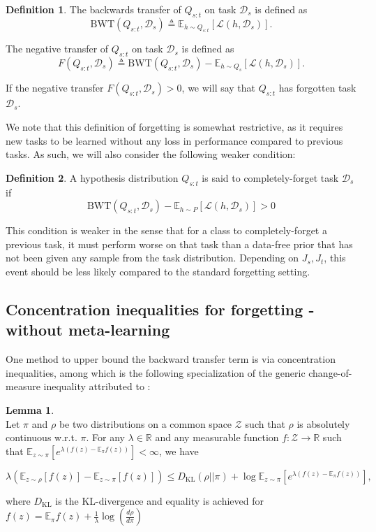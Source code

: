 \documentclass[letterpaper]{article}
\theoremstyle{definition}
\newtheorem{defn}{Definition}[section]
\newtheorem{lemma}{Lemma}[section]
\begin{document}
\begin{defn}
	The backwards transfer of $Q_{s:t}$ on task $\mathcal{D}_s$ is defined as $$\mathrm{BWT}(Q_{s:t}, \mathcal{D}_s) \triangleq \mathbb{E}_{h\sim Q_{s:t}}\left [\mathcal{L}(h, \mathcal{D}_s)\right ].$$
	
	The negative transfer of $Q_{s:t}$ on task $\mathcal{D}_s$ is defined as $$F(Q_{s:t}, \mathcal{D}_s) \triangleq \mathrm{BWT}(Q_{s:t}, \mathcal{D}_s) - \mathbb{E}_{h\sim Q_{s}}\left [\mathcal{L}(h, \mathcal{D}_s)\right ].$$
	
	If the negative transfer $F(Q_{s:t}, \mathcal{D}_s)>0$, we will say that $Q_{s:t}$ has forgotten task $\mathcal{D}_s$.
\end{defn}

We note that this definition of forgetting is somewhat restrictive, as it requires new tasks to be learned without any loss in performance compared to previous tasks. As such, we will also consider the following weaker condition:

\begin{defn}
	A hypothesis distribution $Q_{s:t}$ is said to completely-forget task $\mathcal{D}_s$ if
	$$\mathrm{BWT}(Q_{s:t}, \mathcal{D}_s) - \mathbb{E}_{h\sim P}\left [\mathcal{L}(h, \mathcal{D}_s)\right ]>0$$
\end{defn}

This condition is weaker in the sense that for a class to completely-forget a previous task, it must perform worse on that task than a data-free prior that has not been given any sample from the task distribution. Depending on $J_s,J_t$, this event should be less likely compared to the standard forgetting setting.

\subsection{Concentration inequalities for forgetting - without meta-learning}

One method to upper bound the backward transfer term is via concentration inequalities, among which is the following specialization of the generic change-of-measure inequality attributed to \citet{donsker1975large}:

\begin{lemma} \label{lemma:concentration} \cite{shui2020beyond} \\
	Let $\pi$ and $\rho$ be two distributions on a common space $\mathcal{Z}$ such that $\rho$ is absolutely continuous w.\!r.\!t.\! $\pi$. For any $\lambda\in \mathbb{R}$ and any measurable function $f:\mathcal{Z}\rightarrow \mathbb{R}$ such that $\mathbb{E}_{z\sim \pi}\left [e^{\lambda(f(z)-\mathbb{E}_\pi f(z))} \right ]<\infty$, we have
	
	$$\lambda\left (\mathbb{E}_{z\sim \rho}\left [f(z) \right ]-\mathbb{E}_{z\sim \pi}\left [f(z) \right ]\right )\leq D_{\mathrm{KL}}(\rho||\pi)+ \log\mathbb{E}_{z\sim \pi}\left [e^{\lambda(f(z)-\mathbb{E}_\pi f(z))} \right ],$$
	
	where $D_{\mathrm{KL}}$ is the KL-divergence and equality is achieved for $f(z)=\mathbb{E}_\pi f(z)+\frac{1}{\lambda}\log(\frac{d\rho}{d\pi})$
\end{lemma}
\end{document}
